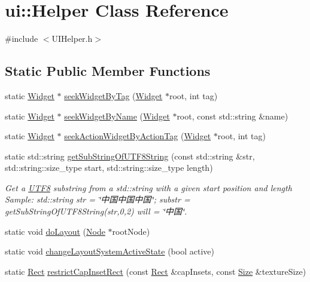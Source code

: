 \hypertarget{classui_1_1Helper}{}\section{ui\+:\+:Helper Class Reference}
\label{classui_1_1Helper}


{\ttfamily \#include $<$U\+I\+Helper.\+h$>$}

\subsection*{Static Public Member Functions}
\begin{DoxyCompactItemize}
\item 
static \hyperlink{classui_1_1Widget}{Widget} $\ast$ \hyperlink{classui_1_1Helper_a98364a262ff81d9bf04953845e7cab09}{seek\+Widget\+By\+Tag} (\hyperlink{classui_1_1Widget}{Widget} $\ast$root, int tag)
\item 
static \hyperlink{classui_1_1Widget}{Widget} $\ast$ \hyperlink{classui_1_1Helper_ad5f762a32af9813af650c1e94e17c957}{seek\+Widget\+By\+Name} (\hyperlink{classui_1_1Widget}{Widget} $\ast$root, const std\+::string \&name)
\item 
static \hyperlink{classui_1_1Widget}{Widget} $\ast$ \hyperlink{classui_1_1Helper_a4ec2c2dfef96d42d88b0ffd3f9d835b7}{seek\+Action\+Widget\+By\+Action\+Tag} (\hyperlink{classui_1_1Widget}{Widget} $\ast$root, int tag)
\item 
static std\+::string \hyperlink{classui_1_1Helper_a0c6b4d01d84cb48a0208a3dd3dbe75b9}{get\+Sub\+String\+Of\+U\+T\+F8\+String} (const std\+::string \&str, std\+::string\+::size\+\_\+type start, std\+::string\+::size\+\_\+type length)
\begin{DoxyCompactList}\small\item\em Get a \hyperlink{structUTF8}{U\+T\+F8} substring from a std\+::string with a given start position and length Sample\+: std\+::string str = \char`\"{}中国中国中国\char`\"{}; substr = get\+Sub\+String\+Of\+U\+T\+F8\+String(str,0,2) will = \char`\"{}中国\char`\"{}. \end{DoxyCompactList}\item 
static void \hyperlink{classui_1_1Helper_ac96dcd9a9bbf8d3ed8dc5d7377da5352}{do\+Layout} (\hyperlink{classNode}{Node} $\ast$root\+Node)
\item 
static void \hyperlink{classui_1_1Helper_a5b96f52949a9150eb4daf14b47deea2d}{change\+Layout\+System\+Active\+State} (bool active)
\item 
static \hyperlink{classRect}{Rect} \hyperlink{classui_1_1Helper_a54622805ac5169a7863ca4a1ea258f38}{restrict\+Cap\+Inset\+Rect} (const \hyperlink{classRect}{Rect} \&cap\+Insets, const \hyperlink{classSize}{Size} \&texture\+Size)

\end{DoxyCompactItemize}
